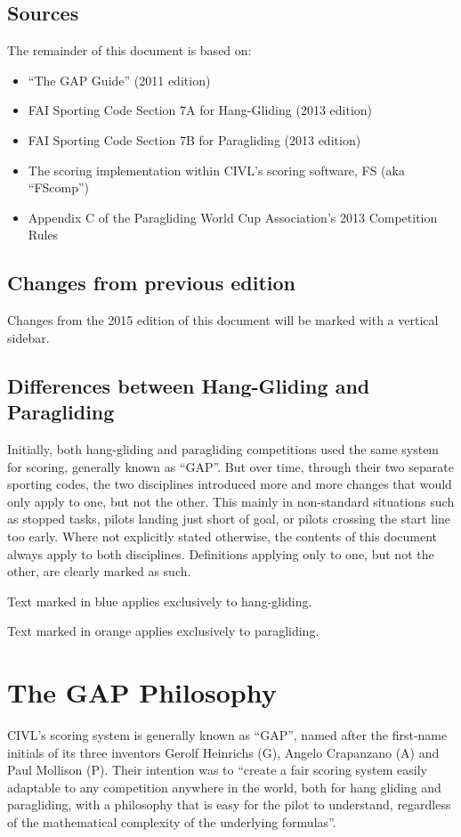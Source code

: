 \documentclass{article}
\begin{document}
\subsection{Sources}
The remainder of this document is based on:
\begin{itemize}
\item “The GAP Guide” (2011 edition)
\item FAI Sporting Code Section 7A for Hang-Gliding (2013 edition)
\item FAI Sporting Code Section 7B for Paragliding (2013 edition)
\item The scoring implementation within CIVL’s scoring software, FS (aka “FScomp”)
\item Appendix C of the Paragliding World Cup Association’s 2013 Competition Rules
\end{itemize}

\subsection{Changes from previous edition}
Changes from the 2015 edition of this document will be marked with a vertical
sidebar.

\subsection{Differences between Hang-Gliding and Paragliding}
Initially, both hang-gliding and paragliding competitions used the same system
for scoring, generally known as “GAP”. But over time, through their two
separate sporting codes, the two disciplines introduced more and more changes
that would only apply to one, but not the other. This mainly in non-standard
situations such as stopped tasks, pilots landing just short of goal, or pilots
crossing the start line too early. Where not explicitly stated otherwise, the
contents of this document always apply to both disciplines. Definitions
applying only to one, but not the other, are clearly marked as such.

\begin{hg}
Text marked in blue applies exclusively to hang-gliding.
\end{hg}

\begin{pg}
Text marked in orange applies exclusively to paragliding.
\end{pg}

\newpage
\section{The GAP Philosophy}
CIVL’s scoring system is generally known as “GAP”, named after the first-name
initials of its three inventors Gerolf Heinrichs (G), Angelo Crapanzano (A) and
Paul Mollison (P). Their intention was to “create a fair scoring system easily
adaptable to any competition anywhere in the world, both for hang gliding and
paragliding, with a philosophy that is easy for the pilot to understand,
regardless of the mathematical complexity of the underlying formulas”.
\end{document}
